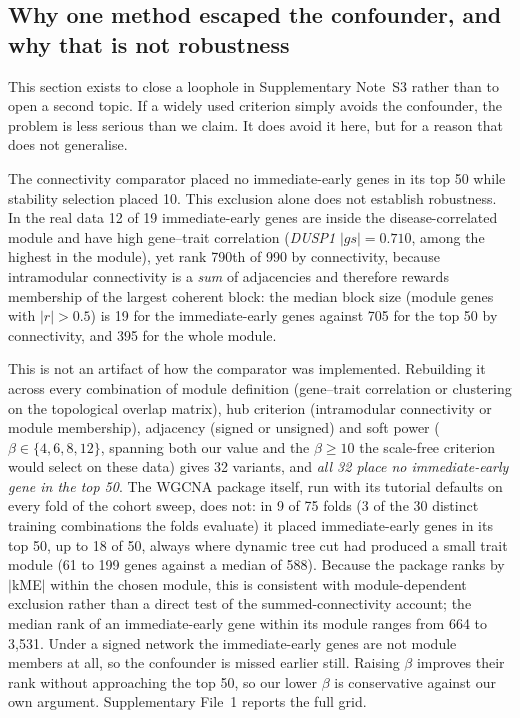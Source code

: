 \documentclass[11pt]{article}
\begin{document}
\subsection{Why one method escaped the confounder, and why that is not
robustness}\label{sec:modulesize}

This section exists to close a loophole in Supplementary Note~S3 rather than to open a
second topic. If a widely used criterion simply avoids the confounder, the problem is less
serious than we claim. It does avoid it here, but for a reason that does not generalise.

The connectivity comparator placed no immediate-early genes in its top 50 while stability
selection placed 10. This exclusion alone does not establish robustness. In the real data 12 of 19 immediate-early genes are inside the disease-correlated
module and have high gene--trait correlation (\textit{DUSP1} $|gs| = 0.710$, among the highest in
the module), yet rank 790th of 990 by connectivity, because intramodular connectivity is a
\emph{sum} of adjacencies and therefore rewards membership of the largest coherent block: the
median block size (module genes with $|r| > 0.5$) is 19 for the immediate-early genes against 705
for the top 50 by connectivity, and 395 for the whole module.

This is not an artifact of how the comparator was implemented. Rebuilding it across every
combination of module definition (gene--trait correlation or clustering on the topological
overlap matrix), hub criterion (intramodular connectivity or module membership), adjacency
(signed or unsigned) and soft power ($\beta \in \{4, 6, 8, 12\}$, spanning both our value and
the $\beta \ge 10$ the scale-free criterion would select on these data) gives 32 variants, and
\emph{all 32 place no immediate-early gene in the top 50}. The WGCNA package itself, run with its
tutorial defaults on every fold of the cohort sweep, does not: in 9 of 75 folds (3 of the 30 distinct training combinations the folds evaluate) it
placed immediate-early genes in its top 50, up to 18 of 50, always where dynamic tree cut had
produced a small trait module (61 to 199 genes against a median of 588). Because the package ranks
by $|$kME$|$ within the chosen module, this is consistent with module-dependent exclusion rather
than a direct test of the summed-connectivity account; the median rank of an immediate-early
gene within its module ranges from 664 to 3{,}531. Under a signed network the immediate-early
genes are not module members at all, so the confounder is missed earlier still. Raising $\beta$
improves their rank without approaching the top 50, so our lower $\beta$ is conservative against
our own argument. Supplementary File~1 reports the full grid.
\end{document}
